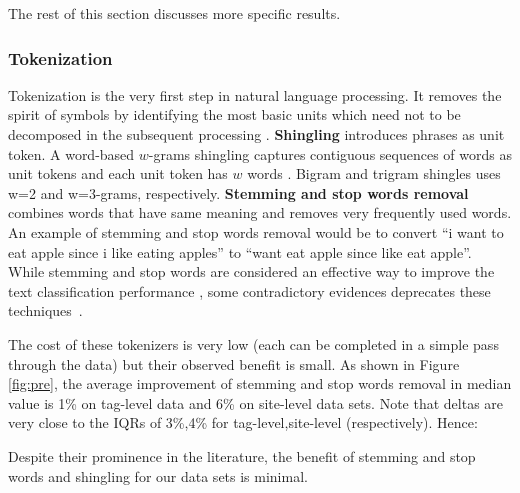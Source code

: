 \documentclass{sig-alternate-05-2015}
\theoremstyle{break}
\begin{document}
The rest of this section discusses more specific results.


\label{sect:Experiment}

\subsubsection{Tokenization}

Tokenization is the very first step in natural language processing. It removes the spirit of symbols by identifying the most basic units which need not to be decomposed in the subsequent processing \cite{webster1992tokenization}. 
\textbf{Shingling} introduces phrases as unit token. A word-based $w$-grams shingling captures contiguous sequences of words as unit tokens and each unit token has $w$ words \cite{chang2009using}. Bigram and trigram shingles uses w=2 and w=3-grams, respectively.
\textbf{Stemming and stop words removal} combines words that have same meaning and removes  very frequently used words. An example of stemming and stop words removal 
would be to convert ``i want to eat apple since i like eating apples'' to
``want eat apple since like eat apple''.
While stemming and stop words are considered  an effective way to improve the text classification performance \cite{yang1997comparative},  some contradictory evidences deprecates these techniques~\cite{moharanatag,stanley2013predicting}. 



 
The   cost of these tokenizers is very low (each can be completed in a simple pass
through the data) but their observed   benefit is small.
As shown in Figure \ref{fig:pre}, the average improvement of stemming and stop words removal in median value is 1\% on tag-level data  and 6\% on site-level  data sets.
Note that  deltas are very close to the IQRs of 3\%,4\% for tag-level,site-level (respectively).  Hence:
\begin{lesson}
Despite their prominence in the literature, the benefit of stemming and stop words
and shingling for our data sets  is minimal.
\end{lesson}
\end{document}
